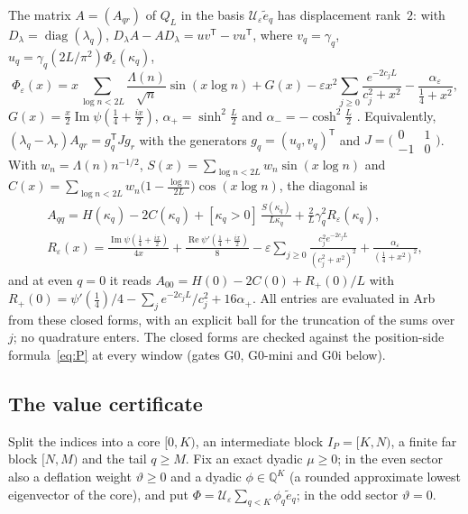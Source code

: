 \documentclass[11pt]{amsart}
\newcommand{\re}{\operatorname{Re}}
\newcommand{\Tp}{\mathsf T}
\theoremstyle{definition}
\theoremstyle{remark}
\numberwithin{equation}{section}
\begin{document}
The matrix $A=(A_{qr})$ of $Q_L$ in the basis $\mathcal U_\varepsilon\tilde e_q$ has displacement rank~$2$: with $D_\lambda=\operatorname{diag}(\lambda_q)$, $D_\lambda A-AD_\lambda=uv^{\Tp}-vu^{\Tp}$, where $v_q=\gamma_q$, $u_q=\gamma_q(2L/\pi^2)\Phi_\varepsilon(\kappa_q)$,
\[
\Phi_\varepsilon(x)=x\sum_{\log n<2L}\frac{\Lambda(n)}{\sqrt n}\sin(x\log n)+G(x)-\varepsilon x^2\sum_{j\ge0}\frac{e^{-2c_jL}}{c_j^2+x^2}-\frac{\alpha_\varepsilon}{\tfrac14+x^2},
\]
$G(x)=\tfrac x2\operatorname{Im}\psi(\tfrac14+\tfrac{ix}2)$, $\alpha_+=\sinh^2\tfrac L2$ and $\alpha_-=-\cosh^2\tfrac L2$ \cite[P4--P5]{supp}. Equivalently, $(\lambda_q-\lambda_r)A_{qr}=g_q^{\Tp}Jg_r$ with the generators $g_q=(u_q,v_q)^{\Tp}$ and $J=\bigl(\begin{smallmatrix}0&1\\-1&0\end{smallmatrix}\bigr)$. With $w_n=\Lambda(n)n^{-1/2}$, $S(x)=\sum_{\log n<2L}w_n\sin(x\log n)$ and $C(x)=\sum_{\log n<2L}w_n\bigl(1-\frac{\log n}{2L}\bigr)\cos(x\log n)$, the diagonal is \cite[P6]{supp}
\begin{gather*}
A_{qq}=H(\kappa_q)-2C(\kappa_q)+[\kappa_q>0]\,\frac{S(\kappa_q)}{L\kappa_q}+\frac2L\gamma_q^2R_\varepsilon(\kappa_q),\\
R_\varepsilon(x)=\frac{\operatorname{Im}\psi(\frac14+\frac{ix}2)}{4x}+\frac{\re\psi'(\frac14+\frac{ix}2)}8-\varepsilon\sum_{j\ge0}\frac{c_j^2e^{-2c_jL}}{(c_j^2+x^2)^2}+\frac{\alpha_\varepsilon}{(\frac14+x^2)^2},
\end{gather*}
and at even $q=0$ it reads $A_{00}=H(0)-2C(0)+R_+(0)/L$ with $R_+(0)=\psi'(\tfrac14)/4-\sum_je^{-2c_jL}/c_j^2+16\alpha_+$. All entries are evaluated in Arb from these closed forms, with an explicit ball for the truncation of the sums over~$j$; no quadrature enters. The closed forms are checked against the position-side formula~\eqref{eq:P} at every window (gates G0, G0-mini and G0i below).

\subsection{The value certificate}\label{sec:piece4cert}
Split the indices into a core $[0,K)$, an intermediate block $I_P=[K,N)$, a finite far block $[N,M)$ and the tail $q\ge M$. Fix an exact dyadic $\mu\ge0$; in the even sector also a deflation weight $\vartheta\ge0$ and a dyadic $\phi\in\mathbb Q^K$ (a rounded approximate lowest eigenvector of the core), and put $\Phi=\mathcal U_\varepsilon\sum_{q<K}\phi_q\tilde e_q$; in the odd sector $\vartheta=0$.
\end{document}
